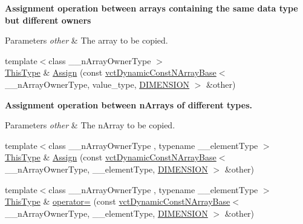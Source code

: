 \begin{Indent}{\bf Assignment operation between arrays containing the same data type but different owners}\par
{\em 
\begin{DoxyParams}{Parameters}
{\em other} & The array to be copied. \\
\hline
\end{DoxyParams}
}\begin{DoxyCompactItemize}
\item 
{\footnotesize template$<$class \+\_\+\+\_\+n\+Array\+Owner\+Type $>$ }\\\hyperlink{classvct_dynamic_const_n_array_base_a5123caffcf1455a1b99003877eade897}{This\+Type} \& \hyperlink{classvct_dynamic_n_array_base_ab9c91c7f9a6c59ba68d3467c26853215}{Assign} (const \hyperlink{classvct_dynamic_const_n_array_base}{vct\+Dynamic\+Const\+N\+Array\+Base}$<$ \+\_\+\+\_\+n\+Array\+Owner\+Type, value\+\_\+type, \hyperlink{classvct_dynamic_n_array_base_aa66532d28588bdf26d08fb593db815d6abfcde386ec801b212d7c42d63a4f3837}{D\+I\+M\+E\+N\+S\+I\+O\+N} $>$ \&other)
\end{DoxyCompactItemize}
\end{Indent}
\begin{Indent}{\bf Assignment operation between n\+Arrays of different types.}\par
{\em 
\begin{DoxyParams}{Parameters}
{\em other} & The n\+Array to be copied. \\
\hline
\end{DoxyParams}
}\begin{DoxyCompactItemize}
\item 
{\footnotesize template$<$class \+\_\+\+\_\+n\+Array\+Owner\+Type , typename \+\_\+\+\_\+element\+Type $>$ }\\\hyperlink{classvct_dynamic_const_n_array_base_a5123caffcf1455a1b99003877eade897}{This\+Type} \& \hyperlink{classvct_dynamic_n_array_base_ae889062e3f1bd8a5cb756b1ffdddfc95}{Assign} (const \hyperlink{classvct_dynamic_const_n_array_base}{vct\+Dynamic\+Const\+N\+Array\+Base}$<$ \+\_\+\+\_\+n\+Array\+Owner\+Type, \+\_\+\+\_\+element\+Type, \hyperlink{classvct_dynamic_n_array_base_aa66532d28588bdf26d08fb593db815d6abfcde386ec801b212d7c42d63a4f3837}{D\+I\+M\+E\+N\+S\+I\+O\+N} $>$ \&other)
\item 
{\footnotesize template$<$class \+\_\+\+\_\+n\+Array\+Owner\+Type , typename \+\_\+\+\_\+element\+Type $>$ }\\\hyperlink{classvct_dynamic_const_n_array_base_a5123caffcf1455a1b99003877eade897}{This\+Type} \& \hyperlink{classvct_dynamic_n_array_base_a864deed65fd52a66cbe69baa302d1f2d}{operator=} (const \hyperlink{classvct_dynamic_const_n_array_base}{vct\+Dynamic\+Const\+N\+Array\+Base}$<$ \+\_\+\+\_\+n\+Array\+Owner\+Type, \+\_\+\+\_\+element\+Type, \hyperlink{classvct_dynamic_n_array_base_aa66532d28588bdf26d08fb593db815d6abfcde386ec801b212d7c42d63a4f3837}{D\+I\+M\+E\+N\+S\+I\+O\+N} $>$ \&other)
\end{DoxyCompactItemize}
\end{Indent}
